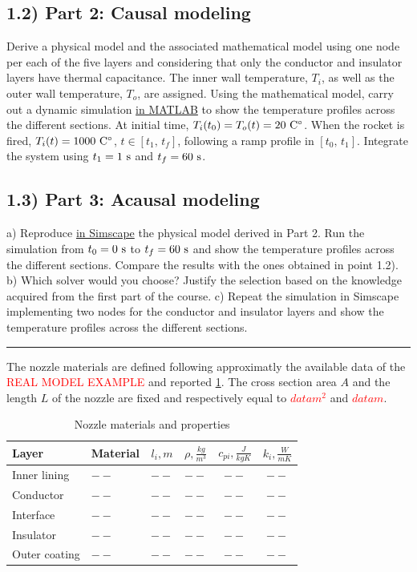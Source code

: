 \documentclass[11pt,a4paper,oneside]{article}
\newcommand{\tr}{\textcolor{red}}
\begin{document}
\subsection*{1.2) Part 2: Causal modeling}
Derive a physical model and the associated mathematical model using one node per each of the five layers and considering that only the conductor and insulator layers have thermal capacitance.
The inner wall temperature, $T_i$, as well as the outer wall temperature, $T_o$, are assigned.
Using the mathematical model, carry out a dynamic simulation \underline{in MATLAB} to show the temperature profiles across the different sections.
At initial time, $T_i(t_0)=T_o(t) = 20\ {\rm C^\circ}$. When the rocket is fired, $T_i(t) = 1000\ {\rm C^\circ}$, $t\in[t_1,\,t_f]$, following a ramp profile in $[t_0,\,t_1]$.
Integrate the system using $t_1 = 1\ {\rm s}$ and $t_f = 60\ {\rm s}$.

\subsection*{1.3) Part 3: Acausal modeling}
a) Reproduce \underline{in Simscape} the physical model derived in Part 2. Run the simulation from $t_0 = 0\ {\rm s}$ to $t_f = 60\ {\rm s}$ and show the temperature profiles across the different sections. Compare the results with the ones obtained in point 1.2). 
b) Which solver would you choose? Justify the selection based on the knowledge acquired from the first part of the course.
c) Repeat the simulation in Simscape implementing two nodes for the conductor and insulator layers and show the temperature profiles across the different sections.
\medskip

\medskip \hrule \medskip
{}

The nozzle materials are defined following approximatly the available data of the \tr{REAL MODEL EXAMPLE} and reported \cref{tab:ex1_material}.
The cross section area $A$ and the length $L$ of the nozzle are fixed and respectively equal to \tr{$data m^2$} and \tr{$data m$}.
\begin{table}[ht]
    \centering
    \caption{\label{tab:ex1_material} Nozzle materials and properties}
    \begin{tabular}{llcccc}
        \toprule
        \toprule
        Layer &  Material & $l_i, m$ & $\rho, \frac{kg}{m^3}$ & $c_{pi}, \frac{J}{kgK}$ & $k_i, \frac{W}{mK}$  \\ 
        \midrule
        Inner lining    & $--$ & $--$ & $--$ & $--$ & $--$ \\ 
        Conductor       & $--$ & $--$ & $--$ & $--$ & $--$ \\ 
        Interface       & $--$ & $--$ & $--$ & $--$ & $--$ \\ 
        Insulator       & $--$ & $--$ & $--$ & $--$ & $--$ \\ 
        Outer coating   & $--$ & $--$ & $--$ & $--$ & $--$ \\ 
        \bottomrule
        \bottomrule
    \end{tabular}
\end{table}
\end{document}
